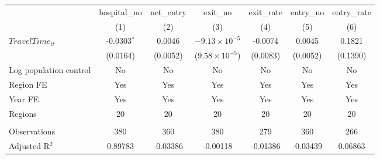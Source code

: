 \begingroup
\centering
\begin{tabular}{lcccccc}
   \toprule
                          & hospital\_no  & net\_entry  & exit\_no                & exit\_rate  & entry\_no  & entry\_rate \\    
                          & (1)           & (2)         & (3)                     & (4)         & (5)        & (6)\\  
   \midrule 
   $TravelTime_{it}$      & -0.0303$^{*}$ & 0.0046      & $-9.13\times 10^{-5}$   & -0.0074     & 0.0045     & 0.1821\\   
                          & (0.0164)      & (0.0052)    & ($9.58\times 10^{-5}$)  & (0.0083)    & (0.0052)   & (0.1390)\\   
   Log population control & No            & No          & No                      & No          & No         & No\\  
   Region FE              & Yes           & Yes         & Yes                     & Yes         & Yes        & Yes\\  
   Year FE                & Yes           & Yes         & Yes                     & Yes         & Yes        & Yes\\  
   Regions                & 20            & 20          & 20                      & 20          & 20         & 20\\  
    \\
   Observations           & 380           & 360         & 380                     & 279         & 360        & 266\\  
   Adjusted R$^2$         & 0.89783       & -0.03386    & -0.00118                & -0.01386    & -0.03439   & 0.06863\\  
   \bottomrule
\end{tabular}
\par\endgroup
